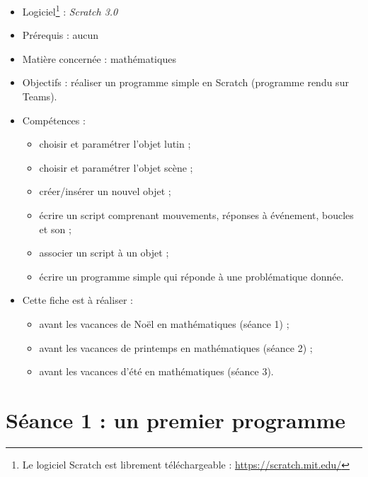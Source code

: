 {\footnotesize
\begin{itemize}
\item Logiciel\footnote{Le logiciel Scratch est librement téléchargeable : \url{https://scratch.mit.edu/}} : \emph{Scratch 3.0}
\item Prérequis : aucun
\item Matière concernée : mathématiques
\item Objectifs : réaliser un programme simple en Scratch (programme rendu sur Teams).
\item Compétences : 
        \begin{itemize}
        \item choisir et paramétrer l'objet lutin ;
        \item choisir et paramétrer l'objet scène ;
        \item créer/insérer un nouvel objet ; 
        \item écrire un script comprenant mouvements, réponses à événement, boucles et son ;
        \item associer un script à un objet ;
        \item écrire un programme simple qui réponde à une problématique donnée.
        \end{itemize}
\item Cette fiche est à réaliser :
        \begin{itemize}
        \item avant les vacances de Noël en mathématiques (séance 1) ;
        \item avant les vacances de printemps en mathématiques (séance 2)  ;
        \item avant les vacances d'été en mathématiques (séance 3). 
        \end{itemize}
\end{itemize}
}







\newpage



\section{Séance 1 : un premier programme}


